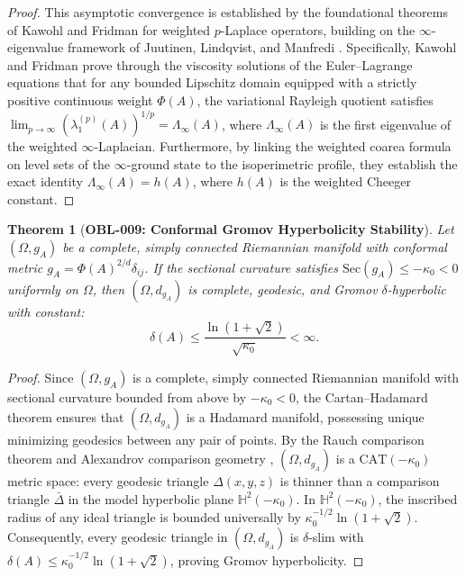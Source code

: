\documentclass[11pt,a4paper,reqno]{amsart}
\newtheorem{theorem}{Theorem}[section]
\theoremstyle{definition}
\theoremstyle{remark}
\numberwithin{equation}{section}
\begin{document}
\begin{proof}
This asymptotic convergence is established by the foundational theorems of Kawohl and Fridman \cite{KawohlFridman2003} for weighted $p$-Laplace operators, building on the $\infty$-eigenvalue framework of Juutinen, Lindqvist, and Manfredi \cite{JuutinenLindqvistManfredi1999}. 
Specifically, Kawohl and Fridman \cite[Theorem~1.1 and Section~2]{KawohlFridman2003} prove through the viscosity solutions of the Euler--Lagrange equations that for any bounded Lipschitz domain equipped with a strictly positive continuous weight $\Phi(A)$, the variational Rayleigh quotient satisfies $\lim_{p \to \infty} (\lambda_1^{(p)}(A))^{1/p} = \Lambda_\infty(A)$, where $\Lambda_\infty(A)$ is the first eigenvalue of the weighted $\infty$-Laplacian. Furthermore, by linking the weighted coarea formula on level sets of the $\infty$-ground state to the isoperimetric profile, they establish the exact identity $\Lambda_\infty(A) = h(A)$, where $h(A)$ is the weighted Cheeger constant.
\end{proof}

\begin{theorem}[\textbf{OBL-009: Conformal Gromov Hyperbolicity Stability}]
\label{thm:gromov_hyperbolicity}
Let $(\Omega, g_A)$ be a complete, simply connected Riemannian manifold with conformal metric $g_A = \Phi(A)^{2/d} \delta_{ij}$. If the sectional curvature satisfies $\mathrm{Sec}(g_A) \le -\kappa_0 < 0$ uniformly on $\Omega$, then $(\Omega, d_{g_A})$ is complete, geodesic, and Gromov $\delta$-hyperbolic with constant:
\begin{equation}
\delta(A) \le \frac{\ln(1 + \sqrt{2})}{\sqrt{\kappa_0}} < \infty.
\end{equation}
\end{theorem}

\begin{proof}
Since $(\Omega, g_A)$ is a complete, simply connected Riemannian manifold with sectional curvature bounded from above by $-\kappa_0 < 0$, the Cartan--Hadamard theorem ensures that $(\Omega, d_{g_A})$ is a Hadamard manifold, possessing unique minimizing geodesics between any pair of points. By the Rauch comparison theorem and Alexandrov comparison geometry \cite{BridsonHaefliger1999,Gromov1987}, $(\Omega, d_{g_A})$ is a $\mathrm{CAT}(-\kappa_0)$ metric space: every geodesic triangle $\Delta(x, y, z)$ is thinner than a comparison triangle $\bar{\Delta}$ in the model hyperbolic plane $\mathbb{H}^2(-\kappa_0)$. In $\mathbb{H}^2(-\kappa_0)$, the inscribed radius of any ideal triangle is bounded universally by $\kappa_0^{-1/2} \ln(1 + \sqrt{2})$. Consequently, every geodesic triangle in $(\Omega, d_{g_A})$ is $\delta$-slim with $\delta(A) \le \kappa_0^{-1/2} \ln(1 + \sqrt{2})$, proving Gromov hyperbolicity.
\end{proof}
\end{document}
